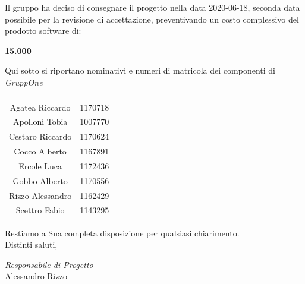 \documentclass{article}
\begin{document}
Il gruppo ha deciso di consegnare il progetto nella data 2020-06-18, seconda data possibile per la revisione di accettazione, preventivando un costo complessivo del prodotto software di:
\begin{center}
  \textbf{15.000 }
\end{center}

Qui sotto si riportano nominativi e numeri di matricola dei componenti di \textit{GruppOne}
\begin{table}[H]%
  \label{tab:componenti}
  \centering
  \begin{tabular}[c]{c c}
    \rowcolor{darkgray!90!}\color{white}{\textbf{Nominativo}} & \color{white}{\textbf{Matricola}} \\
    Agatea Riccardo                                           & 1170718                           \\
    Apolloni Tobia                                            & 1007770                           \\
    Cestaro Riccardo                                          & 1170624                           \\
    Cocco Alberto                                             & 1167891                           \\
    Ercole Luca                                               & 1172436                           \\
    Gobbo Alberto                                             & 1170556                           \\
    Rizzo Alessandro                                          & 1162429                           \\
    Scettro Fabio                                             & 1143295                           \\
  \end{tabular}
\end{table}
Restiamo a Sua completa disposizione per qualsiasi chiarimento.\\
Distinti saluti,

\hspace{2cm}
\begin{adjustwidth}{2.5cm}{10.5cm}
  \centering
  \textit{Responsabile di Progetto}\\
  Alessandro Rizzo\\
  \hspace{2cm}
  \underline{\color{white}{Responsabile di Progetto}}
\end{adjustwidth}
\end{document}
